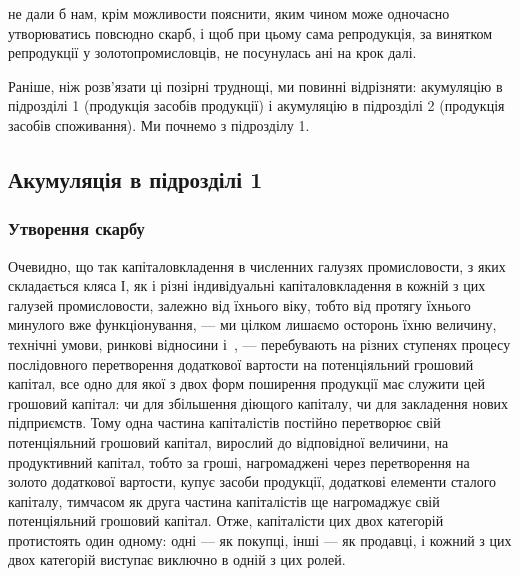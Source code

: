 \parcont{}  %
не дали б нам, крім можливости пояснити, яким чином може одночасно
утворюватись повсюдно скарб, і щоб при цьому сама репродукція, за
винятком репродукції у золотопромисловців, не посунулась ані на
крок далі.

Раніше, ніж розв’язати ці позірні труднощі, ми повинні відрізняти:
акумуляцію в підрозділі 1 (продукція засобів продукції) і акумуляцію
в підрозділі 2 (продукція засобів споживання). Ми почнемо з підрозділу
1.

\subsection{Акумуляція в підрозділі 1}

\subsubsection{Утворення скарбу}

Очевидно, що так капіталовкладення в численних галузях промисловости,
з яких складається кляса І, як і різні індивідуальні капіталовкладення
в кожній з цих галузей промисловости, залежно від їхнього віку,
тобто від протягу їхнього минулого вже функціонування, — ми цілком
лишаємо осторонь їхню величину, технічні умови, ринкові відносини
і~, — перебувають на різних ступенях процесу послідовного перетворення
додаткової вартости на потенціяльний грошовий капітал, все одно
для якої з двох форм поширення продукції має служити цей грошовий
капітал: чи для збільшення діющого капіталу, чи для закладення нових підприємств.
Тому одна частина капіталістів постійно перетворює свій потенціяльний
грошовий капітал, вирослий до відповідної величини, на продуктивний
капітал, тобто за гроші, нагромаджені через перетворення на
золото додаткової вартости, купує засоби продукції, додаткові елементи
сталого капіталу, тимчасом як друга частина капіталістів ще нагромаджує
свій потенціяльний грошовий капітал. Отже, капіталісти цих двох категорій
протистоять один одному: одні — як покупці, інші — як продавці, і
кожний з цих двох категорій виступає виключно в одній з цих ролей.

